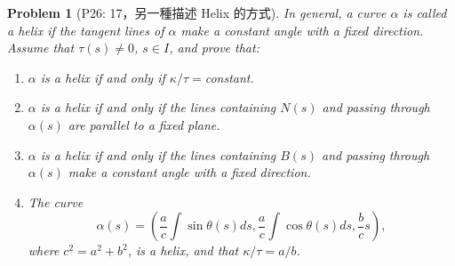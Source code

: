 \documentclass[10pt,a4paper]{article}
\newcounter{theProblemCounter}
\newtheorem{problem}[theProblemCounter]{Problem}
\begin{document}
\setcounter{theProblemCounter}{3}
\begin{problem}[P26: 17，另一種描述 Helix 的方式]
In general, a curve $\alpha$ is called a \emph{helix} if the tangent lines of $\alpha$ make a constant angle with a fixed direction. Assume that $\tau(s)\ne 0$, $s\in I$, and prove that:
\begin{enumerate}
\item[(a)] $\alpha$ is a helix if and only if $\kappa/\tau=$constant.
\item[(b)] $\alpha$ is a helix if and only if the lines containing $N(s)$ and passing through $\alpha(s)$ are parallel to a fixed plane.
\item[(c)] $\alpha$ is a helix if and only if the lines containing $B(s)$ and passing through $\alpha(s)$ make a constant angle with a fixed direction.
\item[(d)] The curve\[
\alpha(s)=\left(\frac{a}{c}\int \sin\theta(s) ds, \frac{a}{c}\int \cos\theta(s) ds, \frac{b}{c} s
\right),
\]
where $c^2=a^2+b^2$, is a helix, and that $\kappa/\tau=a/b$.
\end{enumerate}
\end{problem}
\end{document}
